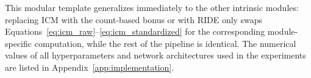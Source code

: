 This modular template generalizes immediately to the other intrinsic modules: replacing ICM with the count-based bonus or with RIDE only swaps Equations~\eqref{eq:icm_raw}--\eqref{eq:icm_standardized} for the corresponding module-specific computation, while the rest of the pipeline is identical. The numerical values of all hyperparameters and network architectures used in the experiments are listed in Appendix~\ref{app:implementation}.
